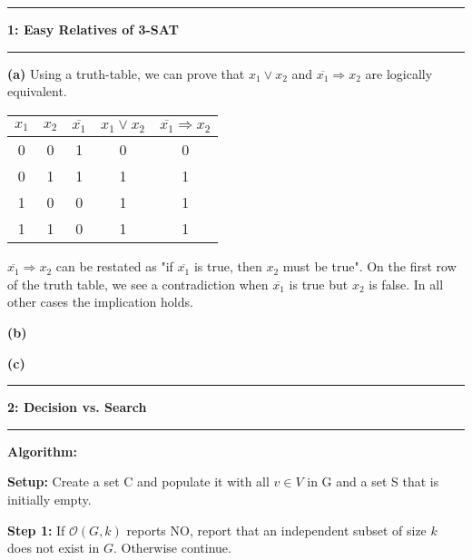 \documentclass[11pt]{article}
\newcommand\question[2]{\vspace{.25in}\hrule\textbf{#1: #2}\vspace{.5em}\hrule\vspace{.10in}}
\renewcommand\part[1]{\vspace{.10in}\textbf{(#1)}}
\newcommand\algorith{\vspace{.10in}\textbf{Algorithm: }}
\begin{document}
\raggedright
\newcommand\NAME{Jake Pitkin}  %
\newcommand\UID{u0891770}     %
\newcommand\HWNUM{3}              %

\question{1}{Easy Relatives of 3-SAT}

\part{a} Using a truth-table, we can prove that $x_1 \lor x_2$ and $\overline{x_1} \Rightarrow x_2$ are logically equivalent.

\begin{table}[H]
\centering
{\renewcommand{\arraystretch}{1.2}%
\begin{tabular}{| c | c | c | c | c |}
\hline
$x_1$ & $x_2$ & $\overline{x_1}$ & $x_1 \lor x_2$ & $\overline{x_1} \Rightarrow x_2$\\
\hline
0 & 0 & 1 & 0 & 0\\ \hline
0 & 1 & 1 & 1 & 1\\ \hline
1 & 0 & 0 & 1 & 1\\ \hline
1 & 1 & 0 & 1 & 1\\ \hline
\end{tabular}}
\end{table}

$\overline{x_1} \Rightarrow x_2$ can be restated as "if $\overline{x_1}$ is true, then $x_2$ must be true". On the first row of the truth table, we see a contradiction when $\overline{x_1}$ is true but $x_2$ is false. In all other cases the implication holds.

\part{b} 

\part{c}

\question{2}{Decision vs. Search}

\algorith 

\textbf{Setup:} Create a set C and populate it with all $v \in V$ in G and a set S that is initially empty. 

\textbf{Step 1:} If $\mathcal{O}(G, k)$ reports NO, report that an independent subset of size $k$ does not exist in $G$. Otherwise continue.
\end{document}
